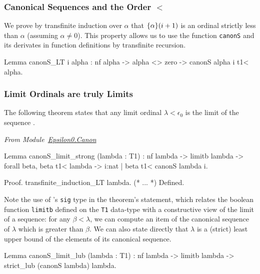 \subsubsection{Canonical Sequences and the Order $<$}


We prove by transfinite induction over $\alpha$ that $\mbox{$\{\alpha\}(i+1)$}$ is an ordinal strictly less than $\alpha$ (assuming $\alpha\not=0$). This property allows us to use the function \texttt{canonS} and its derivates in function definitions by transfinite recursion.

\label{lemma:canonS_LT}
\begin{Coqsrc}
Lemma canonS_LT i alpha :
  nf alpha -> alpha <> zero -> canonS alpha i t1<  alpha.
\end{Coqsrc}


\subsubsection{Limit Ordinals are truly Limits}
The following theorem states that any limit ordinal $\lambda<\epsilon_0$ 
is the limit of the sequence .


\vspace{4pt}
\emph{From Module~\href{../theories/html/hydras.Epsilon0.Canon.html\#canonS_limit_strong}{Epsilon0.Canon}}


\begin{Coqsrc}
Lemma canonS_limit_strong (lambda : T1) : 
     nf lambda ->
     limitb lambda  ->
     forall beta, beta t1< lambda ->
                  {i:nat | beta t1< canonS lambda i}.

Proof.
  transfinite_induction_LT lambda.
  (* ... *)
Defined.
\end{Coqsrc}

\label{lemma:canonS-limit}


Note the use of \coq's \texttt{sig} type in the theorem's statement, which
relates the boolean function \texttt{limitb} defined on the \texttt{T1} data-type with a constructive view of the limit of a sequence: for any $\beta<\lambda$, we can compute an item of the canonical sequence of $\lambda$ which is greater than $\beta$.
We can also state directly that $\lambda$ is a (strict) least upper bound of the elements of its canonical sequence.


\begin{Coqsrc}
Lemma canonS_limit_lub (lambda : T1) :
  nf lambda -> limitb lambda  ->
  strict_lub (canonS lambda) lambda.
\end{Coqsrc}

